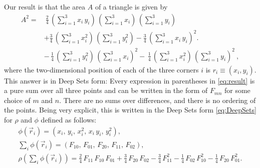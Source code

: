 \documentclass[12pt]{article}
\begin{document}
Our result is that the area $A$ of a triangle is given by
\begin{align}
    A^2 = & \
    \frac{2}{4} \, (\sum_{i=1}^{3} x_i \, y_i ) \, (\sum_{i=1}^{3} x_i ) \, (\sum_{i=1}^{3} y_i )
    \nonumber \\ &
    + \frac{3}{4} \, (\sum_{i=1}^{3} x_i^2 ) \, (\sum_{i=1}^{3} y_i^2 )
    - \frac{3}{4} \, (\sum_{i=1}^{3} x_i \, y_i )^2.
    \nonumber \\ &
    - \, \frac{1}{4} \, (\sum_{i=1}^{3} y_i^2 ) \, (\sum_{i=1}^{3} x_i )^2
    - \, \frac{1}{4} \, (\sum_{i=1}^{3} x_i^2 ) \, (\sum_{i=1}^{3} y_i )^2
     ~, \label{eq:result}
\end{align}
where the two-dimensional position of each of the three corners $i$ is $r_i \equiv (x_i, y_i)$.
This answer is in Deep Sets form:
Every expression in parentheses in \eqref{eq:result} is a pure sum over all three points and can be written in the form of $F_{mn}$ for some choice of $m$ and $n$.
There are no sums over differences, and there is no ordering of the points.
Being very explicit, this is written in the Deep Sets form \eqref{eq:DeepSets} for $\rho$ and $\phi$ defined as follows:
\begin{gather}
    \phi(\vec{r}_i) = (
        x_i, \,
        y_i, \,
        x_i^2, \,
        x_i \, y_i, \,
        y_i^2
    ), \\
    {\textstyle \sum_i} \phi(\vec{r}_i) = (
        F_{10}, \,
        F_{01}, \,
        F_{20}, \,
        F_{11}, \,
        F_{02}
    ), \\
    \rho \left( {\textstyle \sum_i} \phi(\vec{r}_i) \right)
    = \tfrac{2}{4} \, F_{11} \, F_{10} \, F_{01}
    + \tfrac{3}{4} \, F_{20} \, F_{02}
    - \tfrac{3}{4} \, F_{11}^2
    - \tfrac{1}{4} \, F_{02} \, F_{10}^2
    - \tfrac{1}{4} \, F_{20} \, F_{01}^2.
\end{gather}
\end{document}
